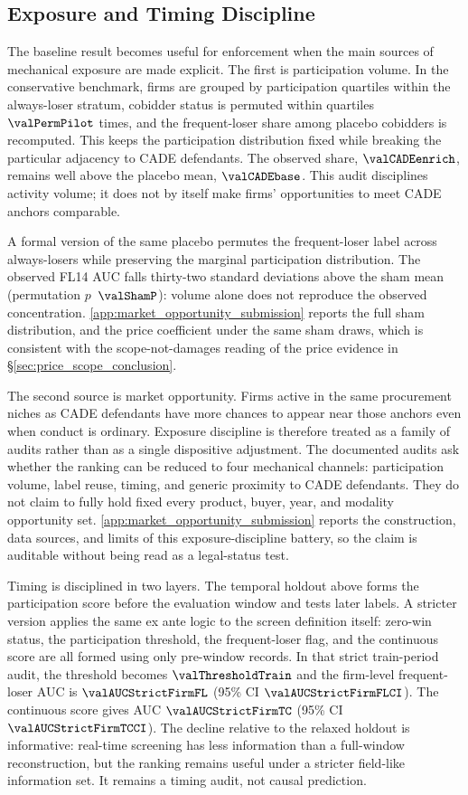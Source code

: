 \subsection{Exposure and Timing Discipline}
\label{sec:validation_exposure_timing}

The baseline result becomes useful for enforcement when the main
sources of mechanical exposure are made explicit. The first is
participation volume. In the conservative benchmark, firms are
grouped by participation quartiles within the always-loser
stratum, cobidder status is permuted within quartiles
$\valPermPilot$ times, and the frequent-loser share among
placebo cobidders is recomputed. This keeps the participation
distribution fixed while breaking the particular adjacency to
CADE defendants. The observed share, $\valCADEenrich$, remains
well above the placebo mean, $\valCADEbase$. This audit
disciplines activity volume; it does not by itself make firms'
opportunities to meet CADE anchors comparable.

A formal version of the same placebo permutes the
frequent-loser label across always-losers while preserving the
marginal participation distribution. The observed FL14 AUC falls
thirty-two standard deviations above the sham mean (permutation
$p$~$\valShamP$): volume alone does not reproduce the observed
concentration. \ref{app:market_opportunity_submission}
reports the full sham distribution, and the price coefficient
under the same sham draws, which is consistent with the
scope-not-damages reading of the price evidence in
\S\ref{sec:price_scope_conclusion}.

The second source is market opportunity. Firms active in the
same procurement niches as CADE defendants have more chances to
appear near those anchors even when conduct is ordinary.
Exposure discipline is therefore treated as a family of audits
rather than as a single dispositive adjustment. The documented
audits ask whether the ranking can be reduced to four mechanical
channels: participation volume, label reuse, timing, and generic
proximity to CADE defendants. They do not claim to fully hold
fixed every product, buyer, year, and modality opportunity set.
\ref{app:market_opportunity_submission} reports the
construction, data sources, and limits of this exposure-discipline
battery, so the claim is auditable without being read as a
legal-status test.

Timing is disciplined in two layers. The temporal holdout above
forms the participation score before the evaluation window and
tests later labels. A stricter version applies the same ex ante
logic to the screen definition itself: zero-win status, the
participation threshold, the frequent-loser flag, and the
continuous score are all formed using only pre-window records.
In that strict train-period audit, the threshold becomes
$\valThresholdTrain$ and the firm-level frequent-loser AUC is
$\valAUCStrictFirmFL$ (95\% CI $\valAUCStrictFirmFLCI$). The
continuous score gives AUC $\valAUCStrictFirmTC$ (95\% CI
$\valAUCStrictFirmTCCI$). The decline relative to the relaxed
holdout is informative: real-time screening has less information
than a full-window reconstruction, but the ranking remains
useful under a stricter field-like information set. It remains a
timing audit, not causal prediction.

